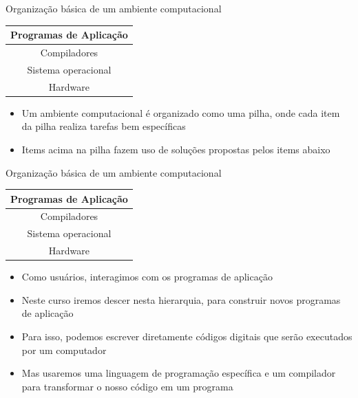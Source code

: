 \documentclass[handout]{beamer}
\begin{document}
\begin{frame}{Organização básica de um ambiente computacional}

    \begin{center}
        \begin{tabular}{|c|} \hline
            Programas de Aplicação \\\hline
            Compiladores \\\hline
            Sistema operacional \\\hline
            Hardware \\\hline
        \end{tabular}
    \end{center}

    \begin{itemize}
        \item Um ambiente computacional é organizado como uma pilha, onde cada item da pilha realiza tarefas bem específicas
        \item Items acima na pilha fazem uso de soluções propostas pelos items abaixo
    \end{itemize}
\end{frame}

\begin{frame}{Organização básica de um ambiente computacional}

    \begin{center}
        \begin{tabular}{|c|} \hline
            \textbf{Programas de Aplicação} \\\hline
            Compiladores \\\hline
            Sistema operacional \\\hline
            Hardware \\\hline
        \end{tabular}
    \end{center}

    \begin{itemize}[<+->]
        \item Como usuários, interagimos com os programas de aplicação
        \item Neste curso iremos descer nesta hierarquia, para construir novos programas de aplicação
        \item Para isso, podemos escrever diretamente códigos digitais que serão executados por um computador
        \item Mas usaremos uma linguagem de programação específica e um compilador para transformar o nosso código em um programa
    \end{itemize}
\end{frame}
\end{document}
